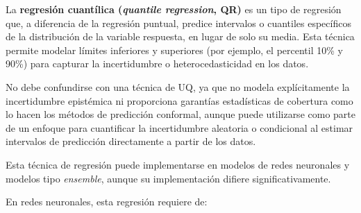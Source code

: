 
La \textbf{regresión cuantílica (\textit{quantile regression}, QR)} es un tipo de regresión que, a diferencia
de la regresión puntual, predice intervalos o cuantiles específicos de la distribución de la variable 
respuesta, en lugar de solo su media. 
Esta técnica permite modelar límites inferiores y superiores (por ejemplo, el percentil 10\% y 90\%) para
capturar la incertidumbre o heterocedasticidad en los datos.

No debe confundirse con una técnica de UQ, ya que no modela explícitamente la incertidumbre epistémica ni 
proporciona garantías estadísticas de cobertura como lo hacen los métodos de predicción conformal, aunque 
puede utilizarse como parte de un enfoque para cuantificar la incertidumbre aleatoria o 
condicional al estimar intervalos de predicción directamente a partir de los datos.

Esta técnica de regresión puede implementarse en modelos de redes neuronales y modelos tipo \textit{ensemble}, 
aunque su implementación difiere significativamente. 

En redes neuronales, esta regresión requiere de:


